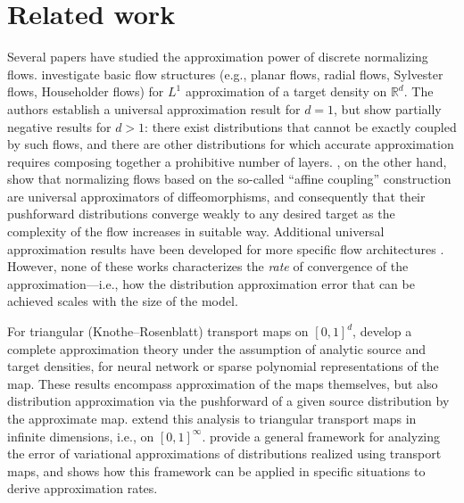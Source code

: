 \section{Related work}

Several papers have studied the approximation power of discrete normalizing flows. \citet{DisAppro2} investigate basic flow structures (e.g., planar flows, radial flows, Sylvester flows, Householder flows) for $L^1$ approximation of a target density on $\mathbb{R}^d$. The authors establish a universal approximation result for $d=1$, but show partially negative results for $d>1$: there exist distributions that cannot be exactly coupled by such flows, and there are other distributions for which accurate approximation requires composing together a prohibitive number of layers. \citet{DisAppro1}, on the other hand, show that normalizing flows based on the so-called ``affine coupling'' construction are universal approximators of diffeomorphisms, and consequently that their pushforward distributions converge weakly to any desired target as the complexity of the flow increases in suitable way. Additional universal approximation results have been developed for more specific flow architectures \citep{NeuralAutoFlow}. However, none of these works characterizes the \emph{rate} of convergence of the approximation---i.e., how the distribution approximation error that can be achieved scales with the size of the model.

For triangular (Knothe--Rosenblatt) transport maps on $[0,1]^d$, \citet{ZM1} develop a complete approximation theory under the assumption of analytic source and target densities, for neural network or sparse polynomial representations of the map. These results encompass approximation of the maps themselves, but also distribution approximation via the pushforward of a given source distribution by the approximate map. \citet{ZM2} extend this analysis to triangular transport maps in infinite dimensions, i.e., on $[0,1]^\infty$. \citet{baptista2023approximation} provide a general framework for analyzing the error of variational approximations of distributions realized using transport maps, and shows how this framework can be applied in specific situations to derive approximation rates.

